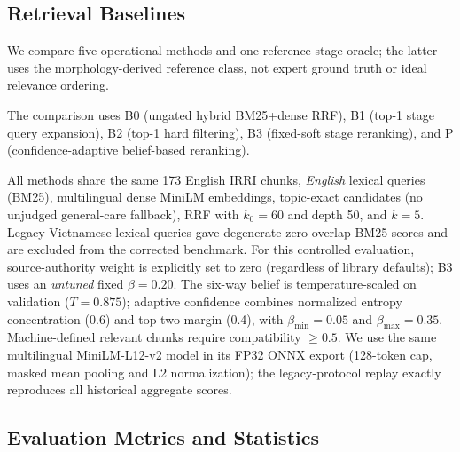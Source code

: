 \documentclass[conference,a4paper]{IEEEtran}
\begin{document}
\subsection{Retrieval Baselines}

We compare five operational methods and one reference-stage oracle; the latter uses the morphology-derived reference class, not expert ground truth or ideal relevance ordering.


The comparison uses B0 (ungated hybrid BM25+dense RRF), B1 (top-1 stage query expansion), B2 (top-1 hard filtering), B3 (fixed-soft stage reranking), and P (confidence-adaptive belief-based reranking).

All methods share the same 173 English IRRI chunks, \emph{English} lexical queries (BM25), multilingual dense MiniLM embeddings, topic-exact candidates (no unjudged general-care fallback), RRF with $k_0=60$ and depth 50, and $k=5$. Legacy Vietnamese lexical queries gave degenerate zero-overlap BM25 scores and are excluded from the corrected benchmark. For this controlled evaluation, source-authority weight is explicitly set to zero (regardless of library defaults); B3 uses an \emph{untuned} fixed $\beta=0.20$. The six-way belief is temperature-scaled on validation ($T=0.875$); adaptive confidence combines normalized entropy concentration (0.6) and top-two margin (0.4), with $\beta_{\min}=0.05$ and $\beta_{\max}=0.35$. Machine-defined relevant chunks require compatibility $\geq0.5$. We use the same multilingual MiniLM-L12-v2 model in its FP32 ONNX export (128-token cap, masked mean pooling and L2 normalization); the legacy-protocol replay exactly reproduces all historical aggregate scores.

\subsection{Evaluation Metrics and Statistics}
\end{document}
